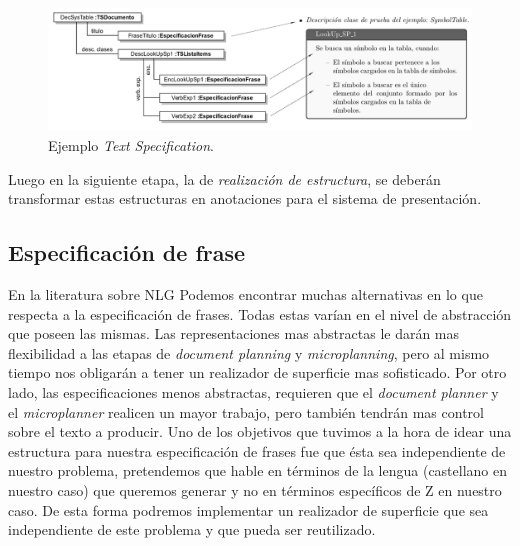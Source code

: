 \begin{figure}[H]
  	\centering
	\includegraphics[scale=0.35]{img/ej_text_spec.png}
	\caption{Ejemplo \emph{Text Specification}.}
  	\label{fig:text_spec}
\end{figure}

Luego en la siguiente etapa, la de \emph{realización de estructura}, se deberán transformar estas estructuras en anotaciones para el sistema de presentación.

\subsection{Especificación de frase}

En la literatura sobre NLG Podemos encontrar muchas alternativas en lo que respecta a la especificación de frases. Todas estas varían en el nivel de abstracción que poseen las mismas. Las representaciones mas abstractas le darán mas flexibilidad a las etapas de \textit{document planning} y \textit{microplanning}, pero al mismo tiempo nos obligarán a tener un realizador de superficie mas sofisticado. Por otro lado, las especificaciones menos abstractas, requieren que el \textit{document planner} y el \textit{microplanner} realicen un mayor trabajo, pero también tendrán mas control sobre el texto a producir. Uno de los objetivos que tuvimos a la hora de idear una estructura para nuestra especificación de frases fue que ésta sea independiente de nuestro problema, pretendemos que hable en términos de la lengua (castellano en nuestro caso) que queremos generar y no en términos específicos de Z en nuestro caso. De esta forma podremos implementar un realizador de superficie que sea independiente de este problema y que pueda ser reutilizado. %


